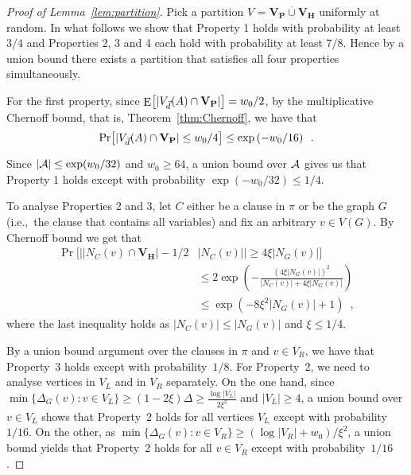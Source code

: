 \documentclass{article}
\providecommand{\abs}[1]{\lvert#1\rvert}
\newcommand{\minofset}[3][:]{\min \{ #2 #1 #3 \}}
\DeclareMathOperator{\Expop}{E}
\newcommand{\Prob}[2][]{\Pr_{#1} \bigl[ #2 \bigr]}
\newcommand{\Expectation}[2][]{\Expop_{#1} \bigl[ #2 \bigr]}
\newcommand{\Setsize}[1]{\bigl\lvert#1\bigr\rvert}
\newcommand{\setsize}[1]{\lvert#1\rvert}
\newcommand{\disjointunion}{\overset{.}{\cup}}
\newcommand{\eqperiod}{\enspace .}
\newcommand{\eqcomma}{\enspace ,}
\newcommand{\ie}{i.e.,\ }
\newcommand{\refthm}[1]{Theorem~\ref{#1}}
\newcommand{\refpi}{\pi}
\newcommand{\neigh}[2][]{N_{{#1}}(#2)}
\renewcommand{\deg}[2][XXXXXXXXXXXX]{\Delta_{#1}(#2)}
\newcommand{\diff}{\xi}
\newcommand{\GdegMax}{\Delta}
\newcommand{\V}[1][]{V_{#1}}
\newcommand{\Vl}{\V[L]}
\newcommand{\Vr}{\V[R]}
\newcommand{\Vp}{\V[P]}
\newcommand{\Vh}{\V[H]}
\newcommand{\Ax}{\ensuremath\mathcal{A}}
\newcommand{\vecthr}{\vec{d}}
\newcommand{\Vfat}[1]{\ensuremath V_{\vecthr}(#1)}
\numberwithin{equation}{section}
\begin{document}
\begin{proof}[Proof of Lemma~\ref{lem:partition}]
  Pick a partition $\V = \mathbf{\Vp} \disjointunion \mathbf{\Vh}$
  uniformly at random.  In what follows we show that Property 1 holds
  with probability at least $3/4$ and Properties 2, 3 and 4 each hold
  with probability at least $7/8$.  Hence by a union bound there
  exists a partition that satisfies all four properties
  simultaneously.
  
  For the first property, since
  $\Expectation{ \setsize{ \Vfat{A} \cap \mathbf{\Vp} } } = w_0/2$, by
  the multiplicative Chernoff bound, that is, \refthm{thm:Chernoff}, we have
  that
  \begin{align}
    \Prob{ \setsize{ \Vfat{A} \cap \mathbf{\Vp} } \le w_0/4 } 
    \le \exp\left(-w_0 / 16\right) \eqperiod
  \end{align}
  Since $\setsize{\Ax} \leq \exp(w_0/32)$ and $w_0 \geq 64$,
  a union bound over $\Ax$ gives 
  us that Property 1 holds except with probability 
  $\exp(-w_0/32)\leq 1/4$.
	
  To analyse Properties 2 and 3,
  let $C$ either be a clause in $\refpi$
  or be the graph $G$ (\ie the clause that
  contains all variables)
  and fix an arbitrary $v \in V(G)$. By Chernoff bound we get that 
  \begin{align}
  \nonumber
    \Prob{ \Setsize{ \setsize{ \neigh[C]{v} \cap \mathbf{\Vh} } - 
    1/2 &\setsize{\neigh[C]{v}} }
    \ge
    4 \diff \abs{ \neigh[G]{v} } }\\\nonumber
    &\le 
      2 \exp \left( -  
      \frac{(4\diff \abs{ \neigh[G]{v} })^2}{ \setsize{\neigh[C]{v}} + 
      4 \diff \abs{ \neigh[G]{v} } } 
      \right) \\		
    &\le \exp \left( - 8
      \diff^2 \abs{ \neigh[G]{v} }
      + 1\right)\eqcomma
  \end{align}
  where the last inequality holds as 
  $ \setsize{\neigh[C]{v}} \leq  \setsize{\neigh[G]{v}}$ and $\diff \leq 1/4$.
  
  
  
  By a union bound argument over the clauses in $\refpi$ and $v \in \Vr$,
  we have that Property~3 holds except with probability~$1/8$.
  For Property~2, we need to analyse vertices in $\Vl$ and in $\Vr$ separately.
  On the one hand, since $\minofset{\deg[G]{v}}{v\in \Vl} \geq (1-2\diff)\GdegMax \geq 
  \frac{\log \setsize{\Vl}}{2\diff^2}$ and $\setsize{\Vl} \ge 4$,
  a union bound over 
  $v\in \Vl$ shows
  that Property~2 holds for all vertices $\Vl$ except with 
  probability~$1/16$.
  On the other, as
  $\minofset{\deg[G]{v}}{v\in \Vr} \geq (\log \setsize{\Vr} + w_0 )/\diff^2$,
  a union bound yields that Property~2 holds for all $v \in \Vr$
  except with probability~$1/16$.





\end{proof}
\end{document}

